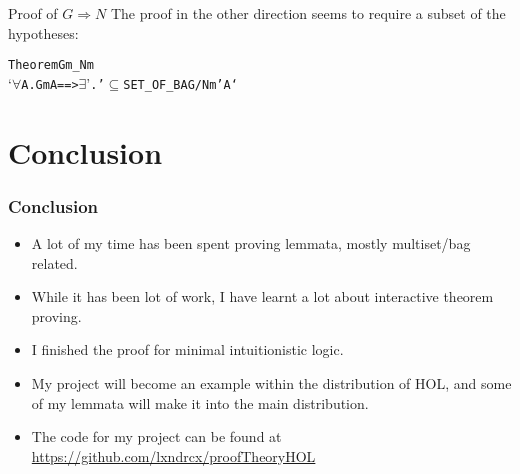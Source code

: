 \documentclass[english,svgnames,hide notes,12pt]{beamer}
\theoremstyle{definition}
\theoremstyle{remark}
\begin{document}
\begin{frame}[fragile]{Proof of $G\Rightarrow N$}
    The proof in the other direction seems to require a subset of the hypotheses:
    \begin{alltt}
Theorem Gm_Nm 
`\(\forall\) \textGamma A. Gm \textGamma A ==> \(\exists\) \textGamma'. \textGamma' \(\subseteq\) SET_OF_BAG \textGamma /\bs{} Nm \textGamma' A` 
    \end{alltt}
\end{frame}

\section{Conclusion}

\begin{frame}
    \frametitle{Conclusion}
    \begin{itemize}
        \item A lot of my time has been spent proving lemmata, mostly multiset/bag related.
        \item While it has been lot of work, I have learnt a lot about interactive theorem proving.
        \item I finished the proof for minimal intuitionistic logic.
        \item My project will become an example within the distribution of HOL, and some of my lemmata will make it into the main distribution.
        \item The code for my project can be found at \url{https://github.com/lxndrcx/proofTheoryHOL}
    \end{itemize}
\end{frame}
\end{document}

